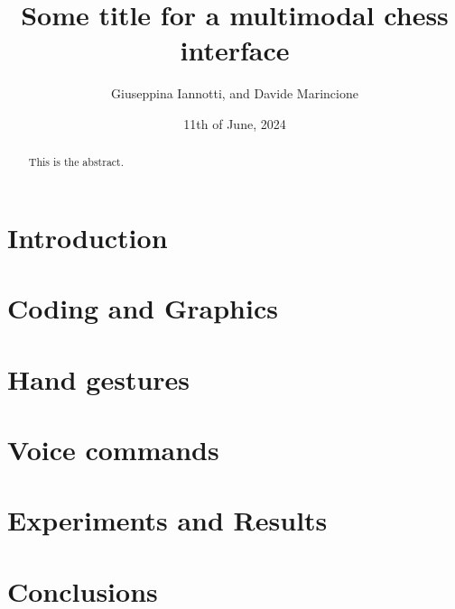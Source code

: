 \documentclass[a4paper, 12pt, onecolumn]{IEEEtran}
\title{Some title for a multimodal chess interface}
\author{Giuseppina Iannotti, and Davide Marincione}
\date{11th of June, 2024}
\begin{document}
    \maketitle
    \begin{abstract}
        This is the abstract.
    \end{abstract}

    \section{Introduction}

    \section{Coding and Graphics}

    \section{Hand gestures}

    \section{Voice commands}

    \section{Experiments and Results}

    \section{Conclusions}
\end{document}
